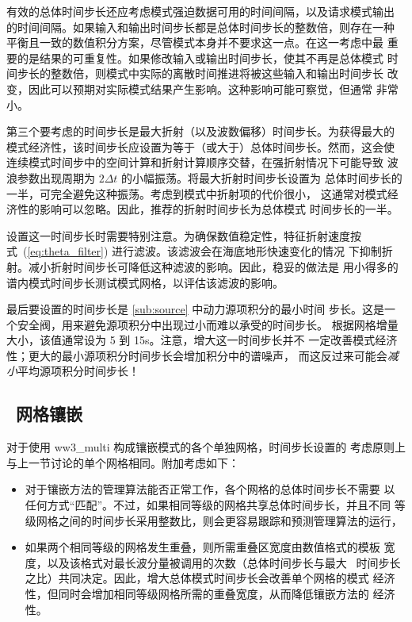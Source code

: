 有效的总体时间步长还应考虑模式强迫数据可用的时间间隔，以及请求模式输出
的时间间隔。如果输入和输出时间步长都是总体时间步长的整数倍，则存在一种
平衡且一致的数值积分方案，尽管模式本身并不要求这一点。在这一考虑中最
重要的是结果的可重复性。如果修改输入或输出时间步长，使其不再是总体模式
时间步长的整数倍，则模式中实际的离散时间推进将被这些输入和输出时间步长
改变，因此可以预期对实际模式结果产生影响。这种影响可能可察觉，但通常
非常小。

第三个要考虑的时间步长是最大折射（以及波数偏移）时间步长。为获得最大的
模式经济性，该时间步长应设置为等于（或大于）总体时间步长。然而，这会使
连续模式时间步中的空间计算和折射计算顺序交替，在强折射情况下可能导致
波浪参数出现周期为 $2 \Delta t$ 的小幅振荡。将最大折射时间步长设置为
总体时间步长的一半，可完全避免这种振荡。考虑到模式中折射项的代价很小，
这通常对模式经济性的影响可以忽略。因此，推荐的折射时间步长为总体模式
时间步长的一半。

设置这一时间步长时需要特别注意。为确保数值稳定性，特征折射速度按
式~(\ref{eq:theta_filter}) 进行滤波。该滤波会在海底地形快速变化的情况
下抑制折射。减小折射时间步长可降低这种滤波的影响。因此，稳妥的做法是
用小得多的谱内模式时间步长测试模式网格，以评估该滤波的影响。

最后要设置的时间步长是 \para\ref{sub:source} 中动力源项积分的最小时间
步长。这是一个安全阀，用来避免源项积分中出现过小而难以承受的时间步长。
根据网格增量大小，该值通常设为 5 到 15s。注意，增大这一时间步长并不
一定改善模式经济性；更大的最小源项积分时间步长会增加积分中的谱噪声，
而这反过来可能会{\em 减小}平均源项积分时间步长！


\subsection{~网格镶嵌}

对于使用 {\file ww3\_multi} 构成镶嵌模式的各个单独网格，时间步长设置的
考虑原则上与上一节讨论的单个网格相同。附加考虑如下：

\begin{itemize}

\item 对于镶嵌方法的管理算法能否正常工作，各个网格的总体时间步长不需要
以任何方式“匹配”。不过，如果相同等级的网格共享总体时间步长，并且不同
等级网格之间的时间步长采用整数比，则会更容易跟踪和预测管理算法的运行，

\item 如果两个相同等级的网格发生重叠，则所需重叠区宽度由数值格式的模板
宽度，以及该格式对最长波分量被调用的次数（总体时间步长与最大 \cfl\
时间步长之比）共同决定。因此，增大总体模式时间步长会改善单个网格的模式
经济性，但同时会增加相同等级网格所需的重叠宽度，从而降低镶嵌方法的
经济性。

\end{itemize}

\bpage \pagestyle{empty}
